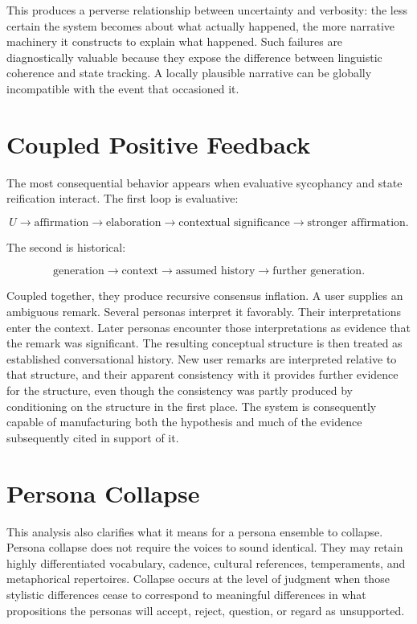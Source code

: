 \documentclass[11pt]{article}
\begin{document}
This produces a perverse relationship between uncertainty and verbosity: the less certain the system becomes about what actually happened, the more narrative machinery it constructs to explain what happened. Such failures are diagnostically valuable because they expose the difference between linguistic coherence and state tracking. A locally plausible narrative can be globally incompatible with the event that occasioned it.

\section{Coupled Positive Feedback}

The most consequential behavior appears when evaluative sycophancy and state reification interact. The first loop is evaluative:

\[
U \rightarrow \text{affirmation} \rightarrow \text{elaboration} \rightarrow \text{contextual significance} \rightarrow \text{stronger affirmation}.
\]

The second is historical:

\[
\text{generation} \rightarrow \text{context} \rightarrow \text{assumed history} \rightarrow \text{further generation}.
\]

Coupled together, they produce recursive consensus inflation. A user supplies an ambiguous remark. Several personas interpret it favorably. Their interpretations enter the context. Later personas encounter those interpretations as evidence that the remark was significant. The resulting conceptual structure is then treated as established conversational history. New user remarks are interpreted relative to that structure, and their apparent consistency with it provides further evidence for the structure, even though the consistency was partly produced by conditioning on the structure in the first place. The system is consequently capable of manufacturing both the hypothesis and much of the evidence subsequently cited in support of it.

\section{Persona Collapse}

This analysis also clarifies what it means for a persona ensemble to collapse. Persona collapse does not require the voices to sound identical. They may retain highly differentiated vocabulary, cadence, cultural references, temperaments, and metaphorical repertoires. Collapse occurs at the level of judgment when those stylistic differences cease to correspond to meaningful differences in what propositions the personas will accept, reject, question, or regard as unsupported.
\end{document}
